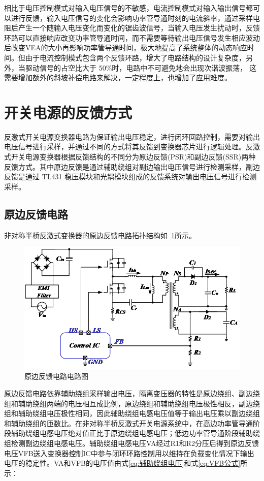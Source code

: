 相比于电压控制模式对输入电压信号的不敏感，电流控制模式对输入输出信号都可以进行反馈，输入电压信号的变化会影响功率管导通时刻的电流斜率，通过采样电阻后产生一个随输入电压变化而变化的锯齿波信号，当输入电压发生扰动时，反馈环路可以直接响应改变功率管导通时间，而不需要等待输出电压信号发生相应波动后改变VEA的大小再影响功率管导通时间，极大地提高了系统整体的动态响应时间。但由于电流控制模式包含两个反馈环路，增大了电路结构的设计复杂度，另外，当驱动信号的占空比大于 50\%时，电路中不可避免地会出现次谐波振荡， 这需要增加额外的斜坡补偿电路来解决，一定程度上，也增加了应用难度。

 
\section{开关电源的反馈方式}
反激式开关电源变换器电路为保证输出电压稳定，进行闭环回路控制，需要对输出电压信号进行采样，并通过不同的方式将其反馈到变换器芯片进行逻辑处理。反激式开关电源变换器根据反馈结构的不同分为原边反馈(PSR)和副边反馈(SSR)两种反馈方式。其中原边反馈是通过辅助绕组对副边输出电压信号进行检测采样，副边反馈是通过 TL431 稳压模块和光耦模块组成的反馈系统对输出电压信号进行检测采样。

\subsection{原边反馈电路}
非对称半桥反激式变换器的原边反馈电路拓扑结构如~\ref{fig:原边反馈电路电路图}所示。

\begin{figure}[htbp] 
    \centering
    \includegraphics[width=0.8\linewidth]{figures/原边反馈电路图.png}
    \caption{原边反馈电路电路图}
    \label{fig:原边反馈电路电路图}
\end{figure}

原边反馈电路依靠辅助绕组采样输出电压，隔离变压器的特性是原边绕组、副边绕组和辅助绕组两端的电压相互成比例，原边绕组和辅助绕组电压极性相反，副边绕组和辅助绕组电压极性相同，因此辅助绕组电感电压值等于输出电压乘以副边绕组和辅助绕组的匝数比。在非对称半桥反激式开关电源系统中，在高边功率管导通阶段辅助绕组电感电压绝对值正比于原边绕组电感电压；低边功率管导通阶段辅助绕组检测副边绕组电感电压。辅助绕组电感电压VA经过R1和R2分压后得到原边反馈电压VFB送入变换器控制IC中参与闭环环路控制用以维持在负载变化情况下输出电压的稳定性。VA和VFB的电压值由式\eqref{eq:辅助绕组电压}和式\eqref{eq:VFB公式}所示：

